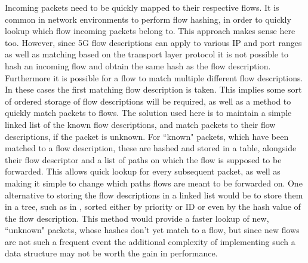 Incoming packets need to be quickly mapped to their respective flows. It is common in network environments to perform flow hashing, in order to quickly lookup which flow incoming packets belong to. This approach makes sense here too. However, since 5G flow descriptions can apply to various IP and port ranges as well as matching based on the transport layer protocol it is not possible to hash an incoming flow and obtain the same hash as the flow description. Furthermore it is possible for a flow to match multiple different flow descriptions. In these cases the first matching flow description is taken. This implies some sort of ordered storage of flow descriptions will be required, as well as a method to quickly match packets to flows. The solution used here is to maintain a simple linked list of the known flow descriptions, and match packets to their flow descriptions, if the packet is unknown. For “known" packets, which have been matched to a flow description, these are hashed and stored in a table, alongside their flow descriptor and a list of paths on which the flow is supposed to be forwarded. This allows quick lookup for every subsequent packet, as well as making it simple to change which paths flows are meant to be forwarded on. One alternative to storing the flow descriptions in a linked list would be to store them in a tree, such as in \cite{tongaonkar2004fast}, sorted either by priority or ID or even by the hash value of the flow description. This method would provide a faster lookup of new, “unknown" packets, whose hashes don't yet match to a flow, but since new flows are not such a frequent event the additional complexity of implementing such a data structure may not be worth the gain in performance.

